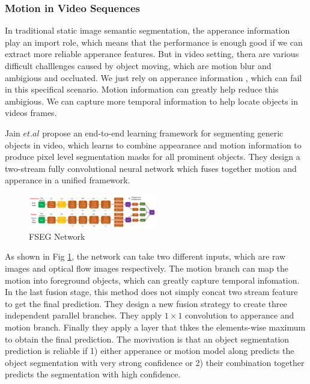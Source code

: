 \subsubsection{Motion in Video Sequences}
In traditional static image semantic segmentation, the apperance information play an import role, which means that 
the performance is enough good if we can extract more reliable apperance features. But in video setting, thera are various
difficult challlenges caused by object moving, which are motion blur and ambigious and occluated. We just rely on apperance information
, which can  fail in this specifical scenario. Motion information can greatly help reduce this ambigious. We can capture more temporal information
to help locate objects in videos frames.

Jain $et.al$ \cite{Jain2017FusionSeg} propose an end-to-end learning framework for segmenting generic objects in video,
which learns to combine appearance and motion information to produce pixel level segmentation masks for all prominent objects.
They design a two-stream fully convolutional neural network which fuses together motion and apperance in a unified framework.

\begin{figure}
    \begin{center}
    \includegraphics[width=0.5\textwidth]{figure/FSEG_NET.png}
    \end{center}
    \caption{FSEG Network}
    \label{FSEG}
\end{figure}

As shown in Fig \ref{FSEG}, the network can take two different inputs, which are raw images and optical flow images respectively.
The motion branch can map the motion into foreground objects, which can greatly capture temporal infomation.
In the last fusion stage, this method does not simply concat two stream feature to get the final prediction.
They design a new fusion strategy to create three independent parallel branches. They apply $1\times1$ convolution to apperance and
motion branch. Finally they apply a layer that thkes the elements-wise maximum to obtain the final prediction. The movivation is that 
an object segmentation prediction is reliable if 1) either apperance or motion model along predicts the object 
segmentation with very strong confidence or 2) their combination together predicts the segmentation with high confidence. 


